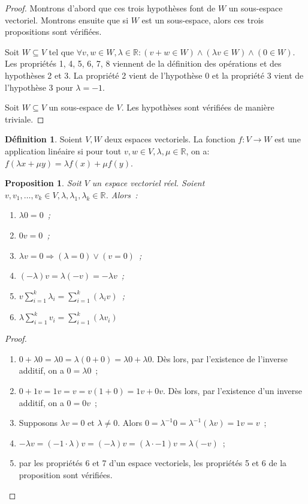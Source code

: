 \documentclass{article}
\newcommand{\R}{\mathbb R}
\newtheorem{prp}[thm]{Proposition}
\theoremstyle{definition}
\newtheorem{déf}[thm]{Définition}
\theoremstyle{remark}
\begin{document}
		\begin{proof} Montrons d'abord que ces trois hypothèses font de $W$ un sous-espace vectoriel. Montrons ensuite que si $W$ est un sous-espace, alors ces trois
		propositions sont vérifiées.

		Soit $W \subseteq V$ tel que $\forall v, w \in W, \lambda \in \R : (v+w \in W) \land (\lambda v \in W) \land (0 \in W)$. Les propriétés 1, 4, 5, 6, 7, 8
		viennent de la définition des opérations et des hypothèses 2 et 3. La propriété 2 vient de l'hypothèse 0 et la propriété 3 vient de l'hypothèse 3 pour
		$\lambda = -1$.

		Soit $W \subseteq V$ un sous-espace de $V$. Les hypothèses sont vérifiées de manière triviale. \end{proof}

		\begin{déf} Soient $V, W$ deux espaces vectoriels. La fonction $f : V \to W$ est une application linéaire si pour tout $v, w \in V, \lambda, \mu \in \R$, on a:
		$f(\lambda x + \mu y) = \lambda f(x) + \mu f(y)$. \end{déf}

		\begin{prp} Soit $V$ un espace vectoriel réel. Soient $v, v_1, \dotsc, v_k \in V, \lambda, \lambda_1, \lambda_k \in \R$. Alors~:
		\begin{enumerate}
			\item $\lambda 0 = 0$~;
			\item $0v = 0$~;
			\item $\lambda v = 0 \Rightarrow (\lambda = 0) \lor (v = 0)$~;
			\item $(-\lambda)v = \lambda(-v) = -\lambda v$~;
			\item $\displaystyle v\sum_{i=1}^k\lambda_i = \sum_{i=1}^k(\lambda_i v)$~;
			\item $\lambda \displaystyle \sum_{i=1}^kv_i = \sum_{i=1}^k(\lambda v_i)$
		\end{enumerate}
		\end{prp}

		\begin{proof}~
			\begin{enumerate}
				\item $0 + \lambda0 = \lambda0 = \lambda(0+0) = \lambda0 + \lambda0$. Dès lors, par l'existence de l'inverse additif, on a $0 = \lambda 0$~;
				\item $0 + 1v = 1v = v = v(1+0) = 1v + 0v$. Dès lors, par l'existence d'un inverse additif, on a $0 = 0v$~;
				\item Supposons $\lambda v = 0$ et $\lambda \neq 0$. Alors $0 = \lambda^{-1}0 = \lambda^{-1}(\lambda v) = 1v = v$~;
				\item $-\lambda v = (-1 \cdot \lambda)v = (-\lambda)v = (\lambda \cdot -1)v = \lambda(-v)$~;
				\item par les propriétés 6 et 7 d'un espace vectoriels, les propriétés 5 et 6 de la proposition sont vérifiées.
			\end{enumerate}
		\end{proof}
\end{document}
